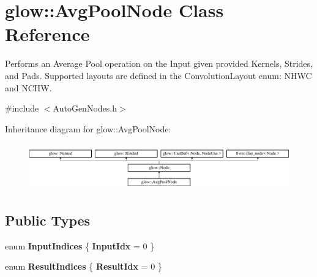\hypertarget{classglow_1_1_avg_pool_node}{}\section{glow\+:\+:Avg\+Pool\+Node Class Reference}
\label{classglow_1_1_avg_pool_node}


Performs an Average Pool operation on the Input given provided Kernels, Strides, and Pads. Supported layouts are defined in the Convolution\+Layout enum\+: N\+H\+WC and N\+C\+HW.  




{\ttfamily \#include $<$Auto\+Gen\+Nodes.\+h$>$}

Inheritance diagram for glow\+:\+:Avg\+Pool\+Node\+:\begin{figure}[H]
\begin{center}
\leavevmode
\includegraphics[height=2.028986cm]{classglow_1_1_avg_pool_node}
\end{center}
\end{figure}
\subsection*{Public Types}
\begin{DoxyCompactItemize}
\item 
\mbox{\label{classglow_1_1_avg_pool_node_a517d310594db9d695a54267aec2ded23}} 
enum {\bfseries Input\+Indices} \{ {\bfseries Input\+Idx} = 0
 \}
\item 
\mbox{\label{classglow_1_1_avg_pool_node_a00dabcb15c3d6304eda688cadb0f6ed5}} 
enum {\bfseries Result\+Indices} \{ {\bfseries Result\+Idx} = 0
 \}
\end{DoxyCompactItemize}
